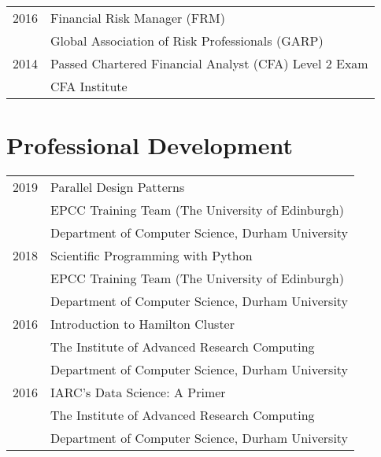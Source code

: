 \documentclass[margin,line,pifont,palatino,courier]{res}
\begin{document}
\begin{resume}
\begin{tabular}{@{}p{0.8in}p{4in}}

2016 & Financial Risk Manager (FRM) \\
& Global Association of Risk Professionals (GARP)\\
 \rule{0pt}{4ex}2014 & Passed Chartered Financial Analyst (CFA) Level 2 Exam \\
& CFA Institute
\end{tabular}

\hrulefill

\section{\sc \bf Professional Development}

\begin{tabular}{@{}p{0.8in}p{4in}}

2019 & Parallel Design Patterns\\
&EPCC Training Team (The University of Edinburgh)\\
&Department of Computer Science, Durham University\\

\rule{0pt}{4ex}2018 & Scientific Programming with Python\\
&EPCC Training Team (The University of Edinburgh)\\
&Department of Computer Science, Durham University\\

\rule{0pt}{4ex}2016 & Introduction to Hamilton Cluster\\
&The Institute of Advanced Research Computing\\
&Department of Computer Science, Durham University\\

\rule{0pt}{4ex}2016 & IARC's Data Science: A Primer\\
&The Institute of Advanced Research Computing\\
&Department of Computer Science, Durham University\\
\end{tabular}

\hrulefill


\end{resume}
\end{document}
